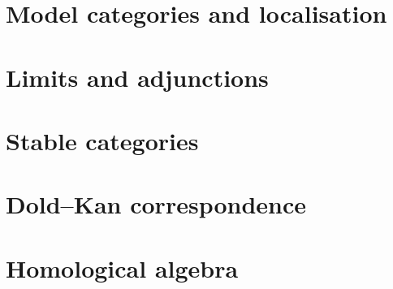 \documentclass[twoside]{article}
\begin{document}


\section{Model categories and localisation}



\section{Limits and adjunctions}



\section{Stable categories}



\section{Dold--Kan correspondence}



\section{Homological algebra}



\printbibliography
\end{document}
